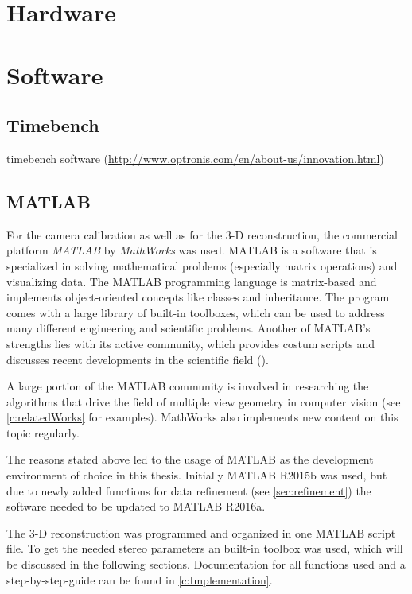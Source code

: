 
\section{Hardware} \label{sec:Hardware}

\section{Software} \label{sec:Software}

\subsection{Timebench} \label{ssec:Timebench}
timebench software (\url{http://www.optronis.com/en/about-us/innovation.html})

\subsection{MATLAB} \label{ssec:Matlab}
For the camera calibration as well as for the 3-D reconstruction, the commercial platform \textit{MATLAB} by \textit{MathWorks} was used. MATLAB is a software that is specialized in solving mathematical problems (especially matrix operations) and visualizing data. The MATLAB programming language is matrix-based and implements object-oriented concepts like classes and inheritance. The program comes with a large library of built-in toolboxes, which can be used to address many different engineering and scientific problems. Another of MATLAB's strengths lies with its active community, which provides costum scripts and discusses recent developments in the scientific field (\cite{MathWorks.2016}).

A large portion of the MATLAB community is involved in researching the algorithms that drive the field of multiple view geometry in computer vision (see \autoref{c:relatedWorks} for examples). MathWorks also implements new content on this topic regularly. 

The reasons stated above led to the usage of MATLAB as the development environment of choice in this thesis. Initially MATLAB R2015b was used, but due to newly added functions for data refinement (see \autoref{sec:refinement}) the software needed to be updated to MATLAB R2016a.
   
The 3-D reconstruction was programmed and organized in one MATLAB script file. To get the needed stereo parameters an built-in toolbox was used, which will be discussed in the following sections. Documentation for all functions used and a step-by-step-guide can be found in \autoref{c:Implementation}.


